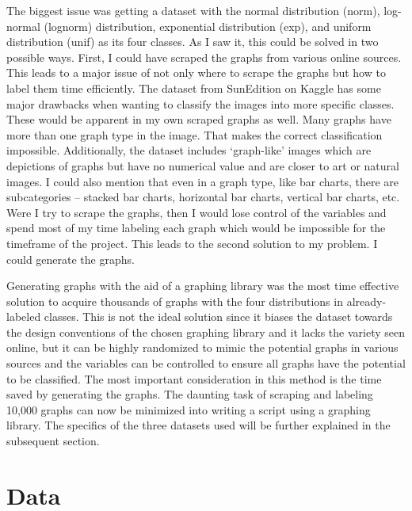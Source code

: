 \documentclass[12pt]{article}
\begin{document}
            The biggest issue was getting a dataset with the normal distribution (norm), log-normal (lognorm) distribution, 
            exponential distribution (exp), and uniform distribution (unif) as its four classes. 
            As I saw it, this could be solved in two possible ways. 
            First, I could have scraped the graphs from various online sources. 
            This leads to a major issue of not only where to scrape the graphs but how to label them time efficiently. 
            The dataset from SunEdition on Kaggle has some major drawbacks when wanting to classify the images into more specific classes. 
            These would be apparent in my own scraped graphs as well. Many graphs have more than one graph type in the image. 
            That makes the correct classification impossible. Additionally, the dataset includes ‘graph-like’ images 
            which are depictions of graphs but have no numerical value and are closer to art or natural images. 
            I could also mention that even in a graph type, like bar charts, there are subcategories -- stacked bar charts, 
            horizontal bar charts, vertical bar charts, etc. 
            Were I try to scrape the graphs, then I would lose control of the variables 
            and spend most of my time labeling each graph which would be impossible for the timeframe of the project. 
            This leads to the second solution to my problem. I could generate the graphs.
        
            Generating graphs with the aid of a graphing library was the most time effective solution to acquire thousands of graphs 
            with the four distributions in already-labeled classes. 
            This is not the ideal solution since it biases the dataset towards the design conventions of the chosen graphing library 
            and it lacks the variety seen online, but it can be highly randomized to mimic the potential graphs in various sources 
            and the variables can be controlled to ensure all graphs have the potential to be classified. 
            The most important consideration in this method is the time saved by generating the graphs. 
            The daunting task of scraping and labeling 10,000 graphs can now be minimized into writing a script using a graphing library. 
            The specifics of the three datasets used will be further explained in the subsequent section.
        
        
    \section{Data}
            
\end{document}

